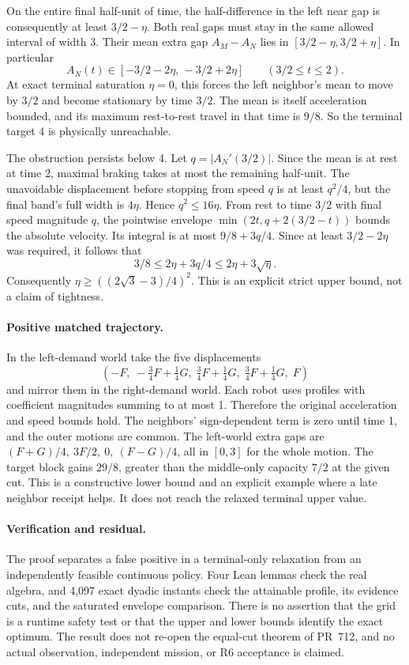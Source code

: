 \documentclass[11pt]{article}
\begin{document}
On the entire final half-unit of time, the half-difference in
the left near gap is consequently at least \(3/2-\eta\).
Both real gaps must stay in the same allowed interval of
width 3. Their mean extra gap \(A_M-A_N\) lies
in \([3/2-\eta,3/2+\eta]\). In particular
\[
     A_N(t)\in[-3/2-2\eta,\,-3/2+2\eta]
       \qquad(3/2\le t\le2).
\]
At exact terminal saturation \(\eta=0\), this forces the
left neighbor's mean to move by \(3/2\) and become stationary
by time \(3/2\). The mean is itself acceleration bounded,
and its maximum rest-to-rest travel in that time is \(9/8\).
So the terminal target 4 is physically unreachable.

The obstruction persists below 4. Let
\(q=|A_N'(3/2)|\). Since the mean is at rest at time 2,
maximal braking takes at most the remaining half-unit.
The unavoidable displacement before stopping from speed \(q\)
is at least \(q^2/4\), but the final band's full width is
\(4\eta\). Hence \(q^2\le16\eta\).
From rest to time \(3/2\) with final speed magnitude \(q\),
the pointwise envelope
\(\min(2t,q+2(3/2-t))\) bounds the absolute velocity.
Its integral is at most \(9/8+3q/4\).
Since at least \(3/2-2\eta\) was required, it follows that
\[
             3/8\le 2\eta+3q/4\le2\eta+3\sqrt\eta .
\]
Consequently \(\eta\ge ((2\sqrt3-3)/4)^2\). This is an
explicit strict upper bound, not a claim of tightness.

\paragraph{Positive matched trajectory.}
In the left-demand world take the five displacements
\[
 \left(-F,\;-\tfrac34F+\tfrac14G,\;
             \tfrac34F+\tfrac14G,\;
             \tfrac34F+\tfrac14G,\;F\right)
\]
and mirror them in the right-demand world.
Each robot uses profiles with coefficient magnitudes
summing to at most 1. Therefore the original acceleration
and speed bounds hold. The neighbors' sign-dependent term
is zero until time 1, and the outer motions are common.
The left-world extra gaps are
\((F+G)/4,\ 3F/2,\ 0,\ (F-G)/4\),
all in \([0,3]\) for the whole motion. The target block
gains \(29/8\), greater than the middle-only capacity
\(7/2\) at the given cut. This is a constructive lower
bound and an explicit example where a late neighbor
receipt helps. It does not reach the relaxed terminal
upper value.

\paragraph{Verification and residual.}
The proof separates a false positive in a terminal-only
relaxation from an independently feasible continuous
policy. Four Lean lemmas check the real algebra, and
4,097 exact dyadic instants check the attainable profile,
its evidence cuts, and the saturated envelope comparison.
There is no assertion that the grid is a runtime safety
test or that the upper and lower bounds identify the exact
optimum. The result does not re-open the equal-cut theorem
of PR~712, and no actual observation, independent mission,
or R6 acceptance is claimed.
\end{document}

